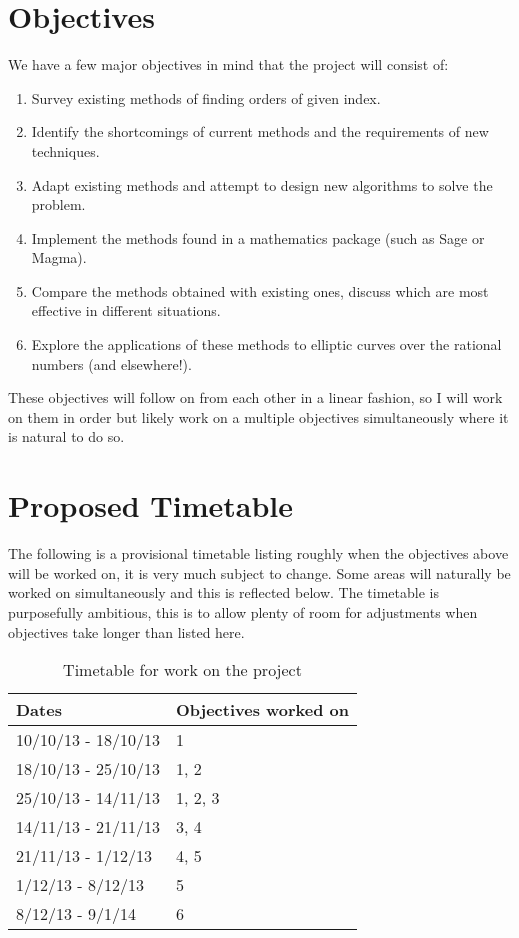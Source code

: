 \documentclass[11pt,a4paper]{article}
\begin{document}
\section*{Objectives}
We have a few major objectives in mind that the project will consist of:
\begin{enumerate}
\item Survey existing methods of finding orders of given index.
\item Identify the shortcomings of current methods and the requirements of new
techniques.
\item Adapt existing methods and attempt to design new algorithms to solve the
problem.
\item Implement the methods found in a mathematics package (such as Sage or
Magma).
\item Compare the methods obtained with existing ones, discuss which are most
effective in different situations.
\item Explore the applications of these methods to elliptic curves over the 
rational numbers (and elsewhere!).
\end{enumerate}

These objectives will follow on from each other in a linear fashion, 
so I will work on them in order but likely work on a multiple objectives 
simultaneously where it is natural to do so.

\section*{Proposed Timetable}
The following is a provisional timetable listing roughly when the objectives
above will be worked on, it is very much subject to change.
Some areas will naturally be worked on simultaneously and this is reflected 
below.
The timetable is purposefully ambitious, this is to allow plenty of room for 
adjustments when objectives take longer than listed here.

\begin{table}[h]
\centering
\begin{tabular}{|l|l|}
\hline
Dates & Objectives worked on \\
\hline
10/10/13 - 18/10/13 & 1 \\
18/10/13 - 25/10/13 & 1, 2 \\
25/10/13 - 14/11/13 & 1, 2, 3 \\
14/11/13 - 21/11/13 & 3, 4 \\
21/11/13 - 1/12/13 & 4, 5 \\
1/12/13 - 8/12/13 & 5 \\
8/12/13 - 9/1/14 & 6 \\
\hline
\end{tabular}
\caption{\label{}Timetable for work on the project}
\end{table}
\end{document}
